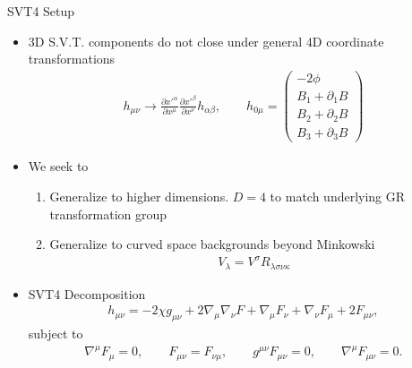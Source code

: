 \documentclass[8pt,aspectratio=1610]{beamer}
\begin{document}
\begin{frame}{SVT4 Setup}
	\begin{itemize}
		\item 3D S.V.T. components do not close under general 4D coordinate transformations
		\begin{eqnarray}
		h_{\mu\nu} \to \frac{\partial x'^\alpha}{\partial x^\mu}\frac{\partial x'^\beta}{\partial x^\nu}h_{\alpha\beta},
		\qquad
		h_{0\mu} = \begin{pmatrix}-2\phi\\B_1 + \partial_1 B\\B_2 + \partial_2 B\\B_3 + \partial_3 B
		\end{pmatrix}
		\end{eqnarray}
		\item We seek to
		\begin{enumerate}
			\begingroup
			\normalsize
			\item Generalize to higher dimensions. $D=4$ to match underlying GR transformation group\vspace{1mm}
			\item Generalize to curved space backgrounds beyond Minkowski
			\begin{eqnarray}
			[\nabla_\kappa, \nabla_\nu] V_\lambda = V^\sigma R_{\lambda\sigma\nu\kappa}
			\end{eqnarray}
			\endgroup
		\end{enumerate}
		\item SVT4 Decomposition
		\begin{eqnarray}
		h_{\mu\nu} = -2\chi g_{\mu\nu} + 2\nabla_\mu\nabla_\nu F + \nabla_\mu F_\nu + \nabla_\nu F_{\mu} + 2F_{\mu\nu},
		\end{eqnarray}
		subject to
		\begin{eqnarray}
		\nabla^\mu F_{\mu} = 0,\qquad F_{\mu\nu} = F_{\nu\mu}, \qquad g^{\mu\nu}F_{\mu\nu} = 0,\qquad \nabla^\mu F_{\mu\nu} = 0.
		\end{eqnarray}
	\end{itemize}
\end{frame}

\end{document}
